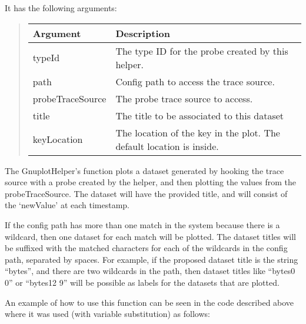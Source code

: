 \documentclass[letterpaper,10pt,english]{sphinxmanual}
\renewcommand{\sphinxcode}[1]{\texttt{\small{#1}}}
\begin{document}
It has the following arguments:
\begin{quote}


\begin{savenotes}\sphinxattablestart
\centering
\begin{tabulary}{\linewidth}[t]{|T|T|}
\hline
\sphinxstyletheadfamily 
Argument
&\sphinxstyletheadfamily 
Description
\\
\hline
typeId
&
The type ID for the probe
created by this helper.
\\
\hline
path
&
Config path to access the
trace source.
\\
\hline
probeTraceSource
&
The probe trace source to
access.
\\
\hline
title
&
The title to be associated
to this dataset
\\
\hline
keyLocation
&
The location of the key in
the plot.  The default
location is inside.
\\
\hline
\end{tabulary}
\par
\sphinxattableend\end{savenotes}
\end{quote}

The GnuplotHelper’s \sphinxcode{} function
plots a dataset generated by hooking the  trace source with a
probe created by the helper, and then plotting the values from the
probeTraceSource.
The dataset will have the provided title, and will consist of
the ‘newValue’ at each timestamp.

If the config path has more than one match in the system because
there is a wildcard, then one dataset for each match will
be plotted.  The dataset titles will be suffixed with the matched
characters for each of the wildcards in the config path,
separated by spaces.  For example, if the proposed dataset title
is the string “bytes”, and there are two wildcards in the path,
then dataset titles like “bytes\sphinxhyphen{}0 0” or “bytes\sphinxhyphen{}12 9” will be
possible as labels for the datasets that are plotted.

An example of how to use this function can be seen in the
\sphinxcode{} code described above where it was used (with
variable substitution) as follows:

\begin{sphinxVerbatim}[commandchars=\\\{\}]
 
\end{sphinxVerbatim}
\end{document}
